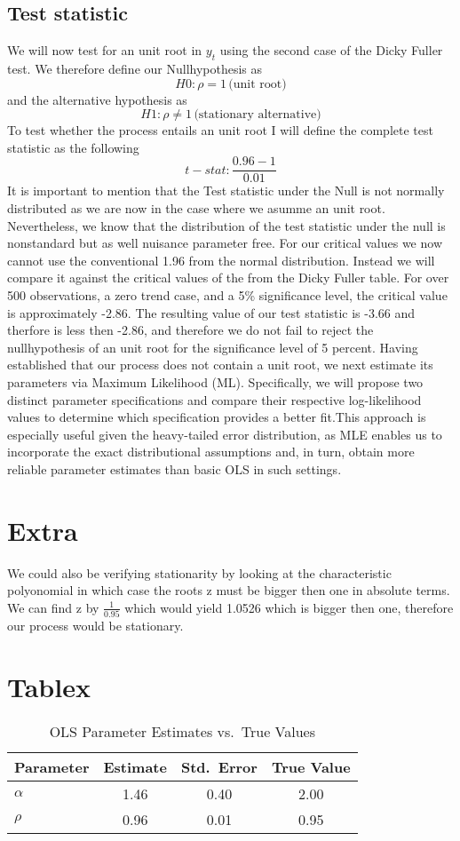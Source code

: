 \documentclass[a4paper,12pt]{article}
\begin{document}
\subsection{Test statistic}
We will now  test for an unit root in $y_t$ using the second case of the Dicky Fuller test. 
We therefore define our Nullhypothesis as 
$$H0 : \rho = 1 \, \text{(unit root)}$$
and the alternative hypothesis as 
$$H1: \rho \neq 1 \, \text{(stationary alternative)}$$
To test whether the process entails an unit root I will define the complete test statistic as the following
$$t-stat: \frac{0.96-1}{0.01}$$
It is important to mention that the Test statistic under the Null is not normally distributed as we are now in the case where we asumme an unit root. Nevertheless, we know that the distribution of the test statistic under the null is nonstandard but as well nuisance parameter free. For our critical values we now cannot use the conventional 1.96 from the normal distribution. Instead we will compare it  against the critical values of the from the Dicky Fuller table.
 For over 500 observations, a zero trend case, and a 5\% significance level, the critical value is approximately -2.86.
The resulting value of our test statistic is -3.66 and therfore is less then -2.86, and therefore we do not fail to reject the nullhypothesis of an unit root for the significance level of 5 percent.
Having established that our process does not contain a unit root, we next estimate its parameters via Maximum Likelihood (ML).  Specifically, we will propose two distinct parameter specifications and compare their respective log-likelihood values to determine which specification provides a better fit.This approach is especially useful given the heavy-tailed error distribution, as MLE enables us to incorporate the exact distributional assumptions and, in turn, obtain more reliable parameter estimates than basic OLS in such settings.
\section{Extra}
We could also be verifying stationarity by looking at the characteristic polyonomial in which case the roots z must be bigger then one in absolute terms. We can find z by $\frac{1}{0.95}$ which would yield 1.0526 which is bigger then one, therefore our process would be stationary.



\section{Tablex}
\begin{table}[ht]
    \centering
    \caption{OLS Parameter Estimates vs.\ True Values}
    \label{tab:ols-results}
    \begin{tabular}{lccc}
        \hline
        \textbf{Parameter} & \textbf{Estimate} & \textbf{Std.\ Error} & \textbf{True Value} \\
        \hline
        $\alpha$ & 1.46 & 0.40 & 2.00 \\
        $\rho$   & 0.96 & 0.01 & 0.95 \\
        \hline
    \end{tabular}
\end{table}
\end{document}
